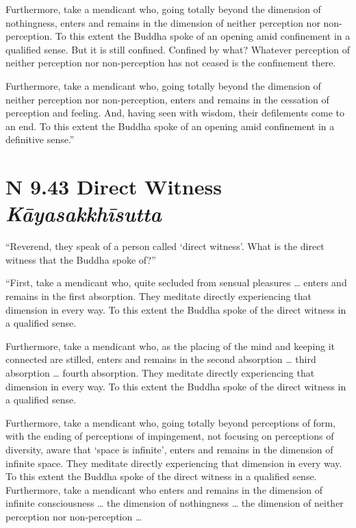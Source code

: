 \documentclass[12pt,openany]{book}%
\newcommand*{\suttatitleacronym}[1]{\smaller[2]{#1}\vspace*{.3em}}
\newcommand*{\suttatitletranslation}[1]{\linebreak{#1}}
\newcommand*{\suttatitleroot}[1]{\linebreak\smaller[2]\itshape{#1}}
\newcommand*{\tocacronym}[1]{\hspace*{-3.3em}{#1}\quad}
\newcommand*{\toctranslation}[1]{#1}
\newcommand*{\tocroot}[1]{(\textit{#1})}
\begin{document}
Furthermore, take a mendicant who, going totally beyond the dimension of nothingness, enters and remains in the dimension of neither perception nor non-perception. To this extent the Buddha spoke of an opening amid confinement in a qualified sense. But it is still confined. Confined by what? Whatever perception of neither perception nor non-perception has not ceased is the confinement there. 

Furthermore, take a mendicant who, going totally beyond the dimension of neither perception nor non-perception, enters and remains in the cessation of perception and feeling. And, having seen with wisdom, their defilements come to an end. To this extent the Buddha spoke of an opening amid confinement in a definitive sense.” 

%
\section*{{\suttatitleacronym AN 9.43}{\suttatitletranslation A Direct Witness }{\suttatitleroot Kāyasakkhīsutta}}
\addcontentsline{toc}{section}{\tocacronym{AN 9.43} \toctranslation{A Direct Witness } \tocroot{Kāyasakkhīsutta}}

“Reverend, they speak of a person called ‘direct witness’. What is the direct witness that the Buddha spoke of?” 

“First, take a mendicant who, quite secluded from sensual pleasures … enters and remains in the first absorption. They meditate directly experiencing that dimension in every way. To this extent the Buddha spoke of the direct witness in a qualified sense. 

Furthermore, take a mendicant who, as the placing of the mind and keeping it connected are stilled, enters and remains in the second absorption … third absorption … fourth absorption. They meditate directly experiencing that dimension in every way. To this extent the Buddha spoke of the direct witness in a qualified sense. 

Furthermore, take a mendicant who, going totally beyond perceptions of form, with the ending of perceptions of impingement, not focusing on perceptions of diversity, aware that ‘space is infinite’, enters and remains in the dimension of infinite space. They meditate directly experiencing that dimension in every way. To this extent the Buddha spoke of the direct witness in a qualified sense. Furthermore, take a mendicant who enters and remains in the dimension of infinite consciousness … the dimension of nothingness … the dimension of neither perception nor non-perception … 
\end{document}

